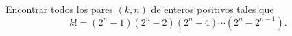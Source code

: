 Encontrar todos los pares $(k, n)$ de enteros positivos tales que
\[ k!=(2^n-1)(2^n-2)(2^n-4)\cdots(2^n-2^{n-1}). \]

